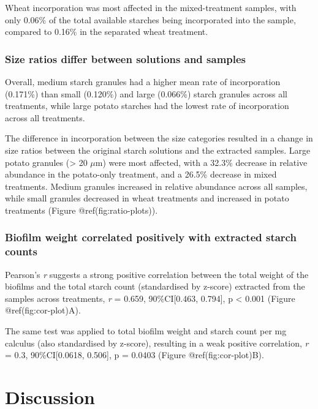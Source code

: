 \documentclass[
  letterpaper,
]{book}
\begin{document}
Wheat incorporation was most affected in the mixed-treatment samples,
with only 0.06\% of the total available starches being incorporated into
the sample, compared to 0.16\% in the separated wheat treatment.

\hypertarget{size-ratios-differ-between-solutions-and-samples}{%
\subsubsection{Size ratios differ between solutions and
samples}\label{size-ratios-differ-between-solutions-and-samples}}

Overall, medium starch granules had a higher mean rate of incorporation
(0.171\%) than small (0.120\%) and large (0.066\%) starch granules
across all treatments, while large potato starches had the lowest rate
of incorporation across all treatments.

The difference in incorporation between the size categories resulted in
a change in size ratios between the original starch solutions and the
extracted samples. Large potato granules (\textgreater{} 20 \(\mu\)m)
were most affected, with a 32.3\% decrease in relative abundance in the
potato-only treatment, and a 26.5\% decrease in mixed treatments. Medium
granules increased in relative abundance across all samples, while small
granules decreased in wheat treatments and increased in potato
treatments (Figure @ref(fig:ratio-plots)).

\hypertarget{biofilm-weight-correlated-positively-with-extracted-starch-counts}{%
\subsubsection{Biofilm weight correlated positively with extracted
starch
counts}\label{biofilm-weight-correlated-positively-with-extracted-starch-counts}}

Pearson's \emph{r} suggests a strong positive correlation between the
total weight of the biofilms and the total starch count (standardised by
z-score) extracted from the samples across treatments, \emph{r} = 0.659,
90\%CI{[}0.463, 0.794{]}, p \textless{} 0.001 (Figure
@ref(fig:cor-plot)A).

The same test was applied to total biofilm weight and starch count per
mg calculus (also standardised by z-score), resulting in a weak positive
correlation, \emph{r} = 0.3, 90\%CI{[}0.0618, 0.506{]}, p = 0.0403
(Figure @ref(fig:cor-plot)B).

\hypertarget{discussion-1}{%
\section{Discussion}\label{discussion-1}}
\end{document}

